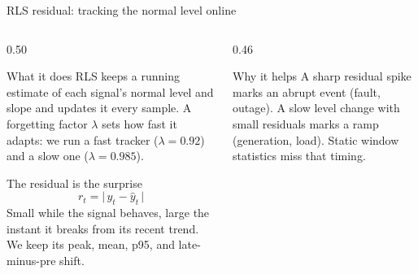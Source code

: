 \documentclass[aspectratio=169,10pt,t]{beamer}
\begin{document}
\fi
\begin{frame}{RLS residual: tracking the normal level online}
\small
\begin{columns}[T,totalwidth=\textwidth]
\begin{column}{0.50\textwidth}
\begin{block}{What it does}
RLS keeps a running estimate of each signal's normal level and slope and updates it every sample. A forgetting factor $\lambda$ sets how fast it adapts: we run a fast tracker ($\lambda{=}0.92$) and a slow one ($\lambda{=}0.985$).
\end{block}
\begin{exampleblock}{The residual is the surprise}
\[
r_t=\bigl|\,y_t-\hat{y}_t\,\bigr|
\]
Small while the signal behaves, large the instant it breaks from its recent trend. We keep its peak, mean, p95, and late-minus-pre shift.
\end{exampleblock}
\end{column}
\begin{column}{0.46\textwidth}
\centering
{}\\[1mm]
\begin{block}{Why it helps}
A sharp residual spike marks an abrupt event (fault, outage). A slow level change with small residuals marks a ramp (generation, load). Static window statistics miss that timing.
\end{block}
\end{column}
\end{columns}
\end{frame}
\end{document}
